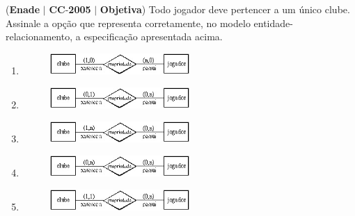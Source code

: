 \documentclass{exam}
\begin{document}
\begin{questions}
\question (\textbf{Enade} $|$ \textbf{CC}-\textbf{2005} $|$ \textbf{Objetiva})
Todo jogador deve pertencer a um único clube.
Assinale a opção que representa corretamente, no modelo
entidade-relacionamento, a especificação apresentada acima.
	\begin{enumerate}[label=\alph*)]
		\item  
\begin{figure}[H]
	\begin{center}
		\includegraphics[width=0.5\textwidth]{CIENCIA_DA_COMPUTACAO_Prova2005-utf8_figuras/fig-0010.jpg}
	\end{center}
\end{figure}
		\item  
\begin{figure}[H]
	\begin{center}
		\includegraphics[width=0.5\textwidth]{CIENCIA_DA_COMPUTACAO_Prova2005-utf8_figuras/fig-0011.jpg}
	\end{center}
\end{figure}
		\item  
\begin{figure}[H]
	\begin{center}
		\includegraphics[width=0.5\textwidth]{CIENCIA_DA_COMPUTACAO_Prova2005-utf8_figuras/fig-0012.jpg}
	\end{center}
\end{figure}
		\item  
\begin{figure}[H]
	\begin{center}
		\includegraphics[width=0.5\textwidth]{CIENCIA_DA_COMPUTACAO_Prova2005-utf8_figuras/fig-0013.jpg}
	\end{center}
\end{figure}
		\item  
\begin{figure}[H]
	\begin{center}
		\includegraphics[width=0.5\textwidth]{CIENCIA_DA_COMPUTACAO_Prova2005-utf8_figuras/fig-0014.jpg}
	\end{center}
\end{figure}
	\end{enumerate}


\end{questions}
\end{document}
